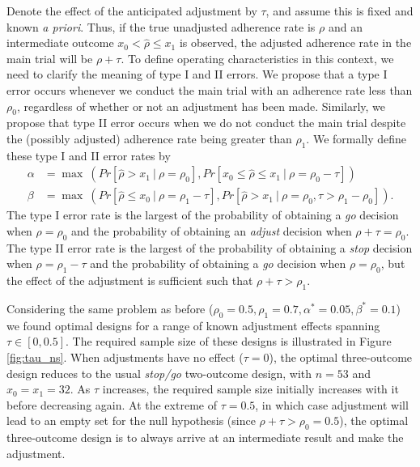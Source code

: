 \documentclass[sagev]{sagej}
\begin{document}
Denote the effect of the anticipated adjustment by $\tau$, and assume this is fixed and known \emph{a priori}. Thus, if the true unadjusted adherence rate is $\rho$ and an intermediate outcome $x_0 < \hat{\rho} \leq x_1$ is observed, the adjusted adherence rate in the main trial will be $\rho + \tau$. To define operating characteristics in this context, we need to clarify the meaning of type I and II errors. We propose that a type I error occurs whenever we conduct the main trial with an adherence rate less than $\rho_0$, regardless of whether or not an adjustment has been made. Similarly, we propose that  type II error occurs when we do not conduct the main trial despite the (possibly adjusted) adherence rate being greater than $\rho_1$. We formally define these type I and II error rates by
\begin{equation}\label{eqn:adj_ocs}
\begin{aligned}
\alpha &= \max ~ (Pr[ \hat{\rho} > x_1 ~|~ \rho = \rho_0 ], Pr[ x_0 \leq \hat{\rho} \leq x_1 ~|~ \rho = \rho_0 - \tau]) \\
\beta &=\max ~ (Pr[ \hat{\rho} \leq x_0 ~|~ \rho = \rho_1 - \tau ], Pr[ \hat{\rho} > x_1 ~|~ \rho = \rho_0, \tau > \rho_1 - \rho_0]).
\end{aligned}
\end{equation}
The type I error rate is the largest of the probability of obtaining a \emph{go} decision when $\rho = \rho_0$ and the probability of obtaining an \emph{adjust} decision when $\rho + \tau = \rho_0$. The type II error rate is the largest of the probability of obtaining a \emph{stop} decision when $\rho = \rho_1 - \tau$ and the probability of obtaining a \emph{go} decision when $\rho = \rho_0$, but the effect of the adjustment is sufficient such that $\rho + \tau > \rho_1$. 

Considering the same problem as before ($\rho_0 = 0.5, \rho_1 = 0.7, \alpha^* = 0.05, \beta^* = 0.1$) we found optimal designs for a range of known adjustment effects spanning $\tau \in [0, 0.5]$. The required sample size of these designs is illustrated in Figure \ref{fig:tau_ns}. When adjustments have no effect ($\tau = 0$), the optimal three-outcome design reduces to the usual \emph{stop/go} two-outcome design, with $n = 53$ and $x_0 = x_1 = 32$. As $\tau$ increases, the required sample size initially increases with it before decreasing again. At the extreme of $\tau = 0.5$, in which case adjustment will lead to an empty set for the null hypothesis (since $\rho + \tau > \rho_0 = 0.5$), the optimal three-outcome design is to always arrive at an intermediate result and make the adjustment.
\end{document}
